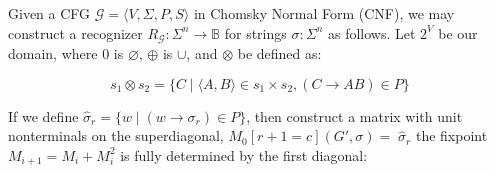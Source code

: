 \documentclass[portrait,a0b,final,a4resizeable]{a0poster}
\begin{document}
\begin{poster}
\begin{multicols}{2}
      \null\hspace*{3cm}\begin{minipage}[c]{0.85\columnwidth}
          Given a CFG $\mathcal{G} = \langle V, \Sigma, P, S\rangle$ in Chomsky Normal Form (CNF), we may construct a recognizer $R_\mathcal{G}: \Sigma^n \rightarrow \mathbb{B}$ for strings $\sigma: \Sigma^n$ as follows. Let $2^V$ be our domain, where $0$ is $\varnothing$, $\oplus$ is $\cup$, and $\otimes$ be defined as:\vspace{0.5cm}
      \end{minipage}

      \[
        s_1 \otimes s_2 = \{C \mid \langle A, B\rangle \in s_1 \times s_2, (C\rightarrow AB) \in P\}
      \]

      \null\hspace*{3cm}\begin{minipage}[c]{0.85\columnwidth}
If we define $\hat\sigma_r = \{w \mid (w \rightarrow \sigma_r) \in P\}$, then construct a matrix with unit nonterminals on the superdiagonal, $M_0[r+1=c](G', \sigma) = \;\hat\sigma_r$ the fixpoint $M_{i+1} = M_i + M_i^2$ is fully determined by the first diagonal:\\
\end{minipage}


\end{multicols}
\end{poster}
\end{document}
